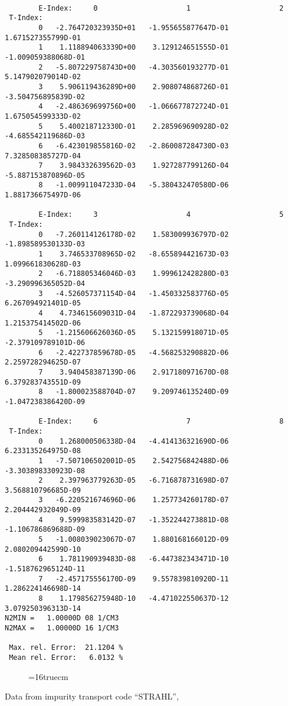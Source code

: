 \documentclass[12pt,dvipdfmx]{article}
\begin{document}
\begin{small}\begin{verbatim}

        E-Index:     0                     1                     2
 T-Index:
        0   -2.764720323935D+01   -1.955655877647D-01    1.671527355799D-01
        1    1.118894063339D+00    3.129124651555D-01   -1.009059388068D-01
        2   -5.807229758743D+00   -4.303560193277D-01    5.147902079014D-02
        3    5.906119436289D+00    2.908074868726D-01   -3.504756895839D-02
        4   -2.486369699756D+00   -1.066677872724D-01    1.675054599333D-02
        5    5.400218712330D-01    2.285969690928D-02   -4.685542119686D-03
        6   -6.423019855816D-02   -2.860087284730D-03    7.328508385727D-04
        7    3.984332639562D-03    1.927287799126D-04   -5.887153870896D-05
        8   -1.009911047233D-04   -5.380432470580D-06    1.881736675497D-06

        E-Index:     3                     4                     5
 T-Index:
        0   -7.260114126178D-02    1.583009936797D-02   -1.898589530133D-03
        1    3.746533708965D-02   -8.655894421673D-03    1.099661830628D-03
        2   -6.718805346046D-03    1.999612428280D-03   -3.290996365052D-04
        3   -4.526057371154D-04   -1.450332583776D-05    6.267094921401D-05
        4    4.734615609031D-04   -1.872293739068D-04    1.215375414502D-06
        5   -1.215606626036D-05    5.132159918071D-05   -2.379109789101D-06
        6   -2.422737859678D-05   -4.568253290882D-06    2.259728294625D-07
        7    3.940458387139D-06    2.917180971670D-08    6.379283743551D-09
        8   -1.800023588704D-07    9.209746135240D-09   -1.047238386420D-09

        E-Index:     6                     7                     8
 T-Index:
        0    1.268000506338D-04   -4.414136321690D-06    6.233135264975D-08
        1   -7.507106502001D-05    2.542756842488D-06   -3.303898330923D-08
        2    2.397963779263D-05   -6.716878731698D-07    3.568810796685D-09
        3   -6.220521674696D-06    1.257734260178D-07    2.204442932049D-09
        4    9.599983583142D-07   -1.352244273881D-08   -1.106786869688D-09
        5   -1.008039023067D-07    1.880168166012D-09    2.080209442599D-10
        6    1.781190939483D-08   -6.447382343471D-10   -1.518762965124D-11
        7   -2.457175556170D-09    9.557839810920D-11    1.286224146698D-14
        8    1.179856275948D-10   -4.471022550637D-12    3.079250396313D-14
N2MIN =   1.00000D 08 1/CM3
N2MAX =   1.00000D 16 1/CM3

 Max. rel. Error:  21.1204 %
 Mean rel. Error:   6.0132 %

\end{verbatim}\end{small}
\begin{figure} \label{2.3.10B1}
\epsfxsize=16truecm
\end{figure}
\newpage
Data from impurity transport code ``STRAHL'', \cite{kn:Behringer}
\end{document}
